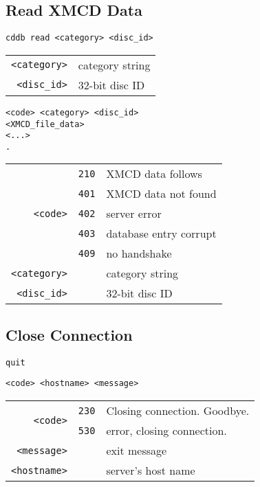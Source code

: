 \subsection{Read XMCD Data}
\begin{Verbatim}[frame=single,label=\textit{To Server},showspaces=true]
cddb read <category> <disc_id>
\end{Verbatim}
\begin{tabular}{rl}
\texttt{<category>} & category string \\
\texttt{<disc\_id>} & 32-bit disc ID
\end{tabular}
\begin{Verbatim}[frame=single,label=\textit{From Server},showspaces=true]
<code> <category> <disc_id>
<XMCD_file_data>
<...>
.
\end{Verbatim}
\begin{tabular}{rcl}
\multirow{5}{3em}{\texttt{<code>}}
& \texttt{210} & XMCD data follows\\
& \texttt{401} & XMCD data not found\\
& \texttt{402} & server error\\
& \texttt{403} & database entry corrupt\\
& \texttt{409} & no handshake \\
\texttt{<category>} & & category string \\
\texttt{<disc\_id>} & & 32-bit disc ID \\
\end{tabular}

\subsection{Close Connection}
\begin{Verbatim}[frame=single,label=\textit{To Server},showspaces=true]
quit
\end{Verbatim}
\begin{Verbatim}[frame=single,label=\textit{From Server},showspaces=true]
<code> <hostname> <message>
\end{Verbatim}
\begin{tabular}{rcl}
\multirow{2}{3em}{\texttt{<code>}}
& \texttt{230} & Closing connection.  Goodbye.\\
& \texttt{530} & error, closing connection.\\
\texttt{<message>} & & exit message \\
\texttt{<hostname>} & & server's host name
\end{tabular}

